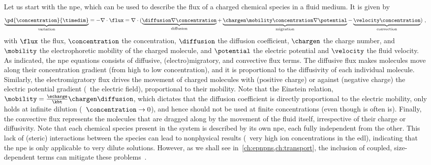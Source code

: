Let us start with the \gls{npe}, which can be used to describe the flux of a charged chemical species in a
fluid medium. It is given by~\cite{Lu-2011}
%
\begin{equation}\label{eq:nanopores_nernst_planck}
  \underbrace{ \pd{\concentration}{\timedim} }_{\text{variation}}
  = - \nabla \cdot \flux = \nabla \cdot (
    \underbrace{ \diffusion \nabla \concentration }_{\text{diffusion}}
    +
    \underbrace { \chargen \mobility \concentration \nabla \potential }_{\text{migration}}
    -
    \underbrace{\velocity \concentration}_{\text{convection}}
    )
  \text{ ,}
\end{equation}
%
with $\flux$ the flux, $\concentration$ the concentration, $\diffusion$ the diffusion coefficient, $\chargen$
the charge number, and $\mobility$ the electrophoretic mobility of the charged molecule, and $\potential$ the
electric potential and $\velocity$ the fluid velocity. As indicated, the \gls{npe} equations consists of
diffusive, (electro)migratory, and convective flux terms. The diffusive flux makes molecules move along their
concentration gradient (from high to low concentration), and it is proportional to the diffusivity of each
individual molecule. Similarly, the electromigratory flux drives the movement of charged molecules with
(positive charge) or against (negative charge) the electric potential gradient (\ie~the electric field),
proportional to their mobility. Note that the Einstein relation,
$\mobility=\frac{\echarge}{\kbt}\chargen\diffusion$, which dictates that the diffusion coefficient is
directly proportional to the electric mobility, only holds at infinite dilution (\ie~$\concentration \to 0$),
and hence should not be used at finite concentrations (even though is often is). Finally, the convective flux
represents the molecules that are dragged along by the movement of the fluid itself, irrespective of their
charge or diffusivity. Note that each chemical species present in the system is described by its own
\gls{npe}, each fully independent from the other. This lack of (steric) interactions between the species can
lead to nonphysical results (\ie~very high ion concentrations in the \gls{edl}), indicating that the \gls{npe}
is only applicable to very dilute solutions. However, as we shall see in~\cref{ch:epnpns,ch:transport}, the
inclusion of coupled, size-dependent terms can mitigate these problems~\cite{Lu-2011}.

